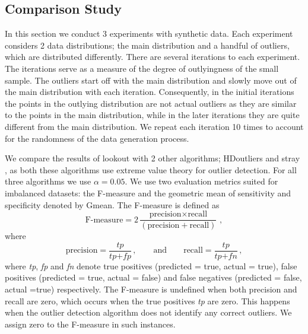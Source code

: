 \documentclass[11pt,a4paper,]{article}
\theoremstyle{definition}
\theoremstyle{definition}
\theoremstyle{definition}
\theoremstyle{remark}
\begin{document}
\hypertarget{comparison-study}{%
\subsection{\texorpdfstring{Comparison Study \label{sec:SyntheticComparison}}{Comparison Study }}\label{comparison-study}}

In this section we conduct 3 experiments with synthetic data. Each experiment considers 2 data distributions; the main distribution and a handful of outliers, which are distributed differently. There are several iterations to each experiment. The iterations serve as a measure of the degree of outlyingness of the small sample. The outliers start off with the main distribution and slowly move out of the main distribution with each iteration. Consequently, in the initial iterations the points in the outlying distribution are not actual outliers as they are similar to the points in the main distribution, while in the later iterations they are quite different from the main distribution. We repeat each iteration 10 times to account for the randomness of the data generation process.

We compare the results of lookout with 2 other algorithms; HDoutliers \autocite{wilkinson2017visualizing} and stray \autocite{pridiltal}, as both these algorithms use extreme value theory for outlier detection. For all three algorithms we use \(\alpha = 0.05\). We use two evaluation metrics suited for imbalanced datasets: the F-measure and the geometric mean of sensitivity and specificity denoted by Gmean. The F-measure is defined as
\begin{equation}\label{eq:fmeasure}
    \text{F-measure} =  2\frac{\text{precision} \times \text{recall}}{\left( \text{precision} + \text{recall} \right) } \, , 
\end{equation}
where
\begin{equation}\label{eq:pr}
    \text{precision} =  \frac{ \textit{tp} }{\textit{tp} + \textit{fp}} \, ,  \qquad \text{and} \qquad \text{recall} = \frac{\textit{tp}}{\textit{tp} + \textit{fn}} \, ,
\end{equation}
where \emph{tp}, \emph{fp} and \emph{fn} denote true positives (predicted = true, actual = true), false positives (predicted = true, actual = false) and false negatives (predicted = false, actual =true) respectively. The F-measure is undefined when both precision and recall are zero, which occurs when the true positives \emph{tp} are zero. This happens when the outlier detection algorithm does not identify any correct outliers. We assign zero to the F-measure in such instances.
\end{document}
